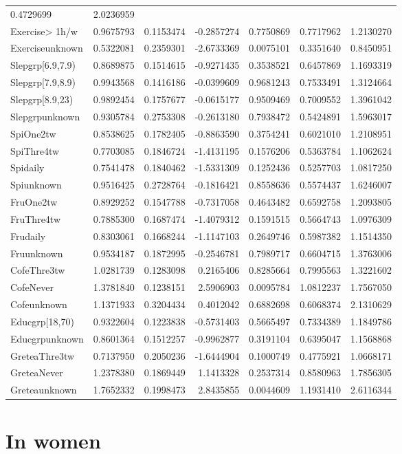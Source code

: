 \documentclass[]{article}
\begin{document}
\begin{longtable}[]{@{}lrrrrrr@{}}
0.4729699 & 2.0236959\tabularnewline
Exercise\textgreater{} 1h/w & 0.9675793 & 0.1153474 & -0.2857274 &
0.7750869 & 0.7717962 & 1.2130270\tabularnewline
Exerciseunknown & 0.5322081 & 0.2359301 & -2.6733369 & 0.0075101 &
0.3351640 & 0.8450951\tabularnewline
Slepgrp{[}6.9,7.9) & 0.8689875 & 0.1514615 & -0.9271435 & 0.3538521 &
0.6457869 & 1.1693319\tabularnewline
Slepgrp{[}7.9,8.9) & 0.9943568 & 0.1416186 & -0.0399609 & 0.9681243 &
0.7533491 & 1.3124664\tabularnewline
Slepgrp{[}8.9,23) & 0.9892454 & 0.1757677 & -0.0615177 & 0.9509469 &
0.7009552 & 1.3961042\tabularnewline
Slepgrpunknown & 0.9305784 & 0.2753308 & -0.2613180 & 0.7938472 &
0.5424891 & 1.5963017\tabularnewline
SpiOne2tw & 0.8538625 & 0.1782405 & -0.8863590 & 0.3754241 & 0.6021010 &
1.2108951\tabularnewline
SpiThre4tw & 0.7703085 & 0.1846724 & -1.4131195 & 0.1576206 & 0.5363784
& 1.1062624\tabularnewline
Spidaily & 0.7541478 & 0.1840462 & -1.5331309 & 0.1252436 & 0.5257703 &
1.0817250\tabularnewline
Spiunknown & 0.9516425 & 0.2728764 & -0.1816421 & 0.8558636 & 0.5574437
& 1.6246007\tabularnewline
FruOne2tw & 0.8929252 & 0.1547788 & -0.7317058 & 0.4643482 & 0.6592758 &
1.2093805\tabularnewline
FruThre4tw & 0.7885300 & 0.1687474 & -1.4079312 & 0.1591515 & 0.5664743
& 1.0976309\tabularnewline
Frudaily & 0.8303061 & 0.1668244 & -1.1147103 & 0.2649746 & 0.5987382 &
1.1514350\tabularnewline
Fruunknown & 0.9534187 & 0.1872995 & -0.2546781 & 0.7989717 & 0.6604715
& 1.3763006\tabularnewline
CofeThre3tw & 1.0281739 & 0.1283098 & 0.2165406 & 0.8285664 & 0.7995563
& 1.3221602\tabularnewline
CofeNever & 1.3781840 & 0.1238151 & 2.5906903 & 0.0095784 & 1.0812237 &
1.7567050\tabularnewline
Cofeunknown & 1.1371933 & 0.3204434 & 0.4012042 & 0.6882698 & 0.6068374
& 2.1310629\tabularnewline
Educgrp{[}18,70) & 0.9322604 & 0.1223838 & -0.5731403 & 0.5665497 &
0.7334389 & 1.1849786\tabularnewline
Educgrpunknown & 0.8601364 & 0.1512257 & -0.9962877 & 0.3191104 &
0.6395047 & 1.1568868\tabularnewline
GreteaThre3tw & 0.7137950 & 0.2050236 & -1.6444904 & 0.1000749 &
0.4775921 & 1.0668171\tabularnewline
GreteaNever & 1.2378380 & 0.1869449 & 1.1413328 & 0.2537314 & 0.8580963
& 1.7856305\tabularnewline
Greteaunknown & 1.7652332 & 0.1998473 & 2.8435855 & 0.0044609 &
1.1931410 & 2.6116344\tabularnewline
\bottomrule
\end{longtable}

\hypertarget{in-women-1}{%
\section{In women}\label{in-women-1}}
\end{document}
